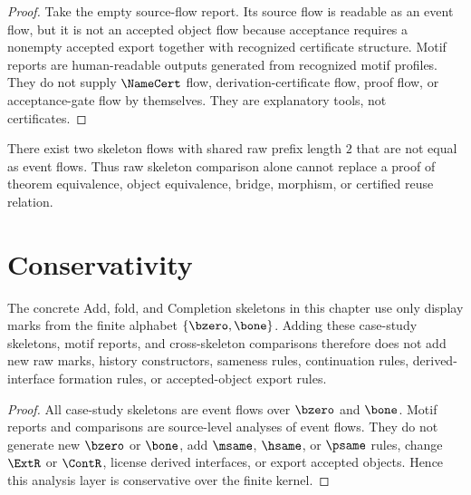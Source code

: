 \begin{proof}
Take the empty source-flow report. Its source flow is readable as an event flow, but it is not an accepted object flow because acceptance requires a nonempty accepted export together with recognized certificate structure. Motif reports are human-readable outputs generated from recognized motif profiles. They do not supply $\NameCert$ flow, derivation-certificate flow, proof flow, or acceptance-gate flow by themselves. They are explanatory tools, not certificates.
\end{proof}

\begin{corollary}
\label{cor:case-studies-comparison-not-proof}
There exist two skeleton flows with shared raw prefix length $2$ that are not equal as event flows. Thus raw skeleton comparison alone cannot replace a proof of theorem equivalence, object equivalence, bridge, morphism, or certified reuse relation.
\end{corollary}

\section{Conservativity}
\label{sec:case-studies-conservativity}

\begin{theorem}
\label{thm:case-studies-conservativity}
The concrete Add, fold, and Completion skeletons in this chapter use only display marks from the finite alphabet $\{\bzero,\bone\}$. Adding these case-study skeletons, motif reports, and cross-skeleton comparisons therefore does not add new raw marks, history constructors, sameness rules, continuation rules, derived-interface formation rules, or accepted-object export rules.
\end{theorem}

\begin{proof}
All case-study skeletons are event flows over $\bzero$ and $\bone$. Motif reports and comparisons are source-level analyses of event flows. They do not generate new $\bzero$ or $\bone$, add $\msame$, $\hsame$, or $\psame$ rules, change $\ExtR$ or $\ContR$, license derived interfaces, or export accepted objects. Hence this analysis layer is conservative over the finite kernel.
\end{proof}

